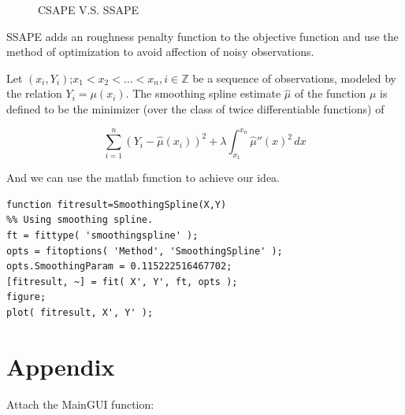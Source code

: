 \documentclass[
10pt, %
a4paper, %
oneside, %
headinclude,footinclude, %
BCOR5mm, %
]{scrartcl}
\begin{document}
\begin{figure}[tb]
\centering
{} \quad
{}
\caption[CSAPE V.S. SSAPE]{CSAPE V.S. SSAPE}
\end{figure}


SSAPE adds an roughness penalty function to the objective function and use the method of optimization to avoid affection of  noisy observations.

\begin{definition}
Let $(x_{i},Y_{i})$;$x_{1}<x_{2}<\dots <x_{n},i\in \mathbb {Z}$  be a sequence of observations, modeled by the relation $Y_{i}=\mu (x_{i})$. The smoothing spline estimate ${\hat {\mu }}$ of the function $\mu$  is defined to be the minimizer (over the class of twice differentiable functions) of

\begin{equation}
\sum _{i=1}^{n}(Y_{i}-{\hat {\mu }}(x_{i}))^{2}+\lambda \int _{x_{1}}^{x_{n}}{\hat {\mu }}''(x)^{2}\,dx
\label{eq:smooth}
\end{equation}
\end{definition}


And we can use the matlab function to achieve our idea. 
\begin{lstlisting}
function fitresult=SmoothingSpline(X,Y)
%% Using smoothing spline.
ft = fittype( 'smoothingspline' );
opts = fitoptions( 'Method', 'SmoothingSpline' );
opts.SmoothingParam = 0.115222516467702;
[fitresult, ~] = fit( X', Y', ft, opts );
figure;
plot( fitresult, X', Y' );
\end{lstlisting}







\section*{Appendix}
Attach the MainGUI function:

\end{document}
